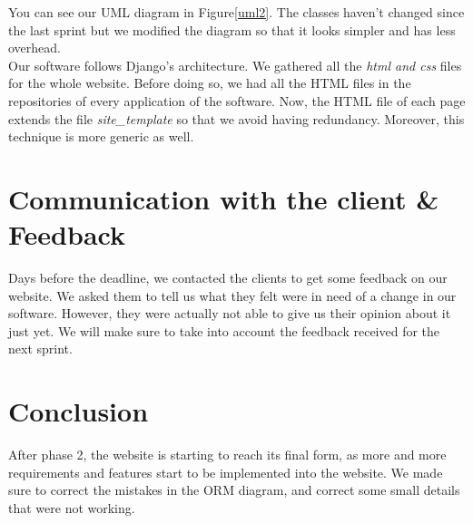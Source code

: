 \documentclass[a4paper, 12pt]{article}
\begin{document}
You can see our UML diagram in Figure\ref{uml2}. The classes haven't changed since the last sprint but we modified the diagram so that it looks simpler and has less overhead.\\


Our software follows Django's architecture. We gathered all the \textit{html and css} files for the whole website. Before doing so, we had all the HTML files in the repositories of every application of the software. Now, the HTML file of each page extends the file \textit{site\_template} so that we avoid having redundancy. Moreover, this technique is more generic as well. \\
\newpage

\section{Communication with the client \& Feedback}
Days before the deadline, we contacted the clients to get some feedback on our website. We asked them to tell us what they felt were in need of a change in our software. However, they were actually not able to give us their opinion about it just yet. We will make sure to take into account the feedback received for the next sprint. \\

\section{Conclusion}
After phase 2, the website is starting to reach its final form, as more and more requirements and features start to be implemented into the website. We made sure to correct the mistakes in the ORM diagram, and correct some small details that were not working. 
\end{document}

